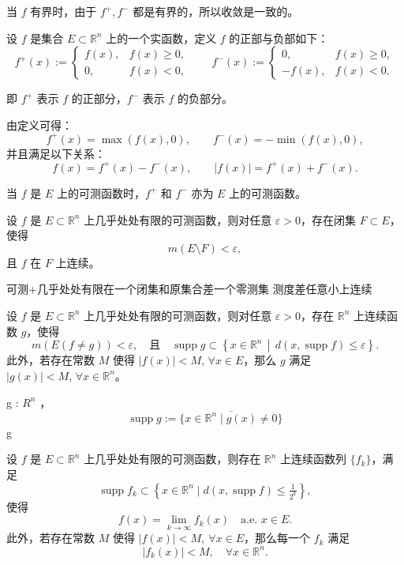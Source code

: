 \documentclass[lang=cn,10pt]{elegantbook}
\begin{document}
当 $f$ 有界时，由于 $f^+, f^-$ 都是有界的，所以收敛是一致的。
\begin{definition}
设 $f$ 是集合 $E \subset \mathbb{R}^n$ 上的一个实函数，定义 $f$ 的正部与负部如下：
\[
f^+(x) := 
\begin{cases}
f(x), & f(x) \geq 0, \\
0,    & f(x) < 0,
\end{cases}
\qquad
f^-(x) := 
\begin{cases}
0,    & f(x) \geq 0, \\
-f(x), & f(x) < 0.
\end{cases}
\]

即 $f^+$ 表示 $f$ 的正部分，$f^-$ 表示 $f$ 的负部分。

由定义可得：
\[
f^+(x) = \max(f(x), 0), \qquad f^-(x) = -\min(f(x), 0),
\]
并且满足以下关系：
\[
f(x) = f^+(x) - f^-(x), \qquad |f(x)| = f^+(x) + f^-(x).
\]

当 $f$ 是 $E$ 上的可测函数时，$f^+$ 和 $f^-$ 亦为 $E$ 上的可测函数。
\end{definition}
\begin{theorem}[Lusin]
设 $f$ 是 $E \subset \mathbb{R}^n$ 上几乎处处有限的可测函数，则对任意 $\varepsilon > 0$，存在闭集 $F \subset E$，使得
\[
m(E \setminus F) < \varepsilon,
\]
且 $f$ 在 $F$ 上连续。
\end{theorem}

可测+几乎处处有限在一个闭集和原集合差一个零测集 测度差任意小上连续
\begin{theorem}
设 $f$ 是 $E \subset \mathbb{R}^n$ 上几乎处处有限的可测函数，则对任意 $\varepsilon > 0$，存在 $\mathbb{R}^n$ 上连续函数 $g$，使得
\[
m(E(f \neq g)) < \varepsilon, \quad \text{且} \quad \operatorname{supp} g \subset \left\{ x \in \mathbb{R}^n \,\middle|\, d(x, \operatorname{supp} f) \leq \varepsilon \right\}.
\]
此外，若存在常数 $M$ 使得 $|f(x)| < M, \, \forall x \in E$，那么 $g$ 满足 $|g(x)| < M, \, \forall x \in \mathbb{R}^n$。
\end{theorem}
 g : \mathbb${R}^n$ \to {}，
\[
\operatorname{supp} g := \overline{\{ x \in \mathbb{R}^n \mid g(x) \neq 0 \}}
\]
 g 
\begin{theorem}[3.2.4 可测函数是连续函数的极限]
设 $f$ 是 $E \subset \mathbb{R}^n$ 上几乎处处有限的可测函数，则存在 $\mathbb{R}^n$ 上连续函数列 $\{f_k\}$，满足
\[
\operatorname{supp} f_k \subset \left\{ x \in \mathbb{R}^n \mid d(x, \operatorname{supp} f) \leq \tfrac{1}{2^k} \right\},
\]
使得
\[
f(x) = \lim_{k \to \infty} f_k(x) \quad \text{a.e. } x \in E.
\]
此外，若存在常数 $M$ 使得 $|f(x)| < M,\ \forall x \in E$，那么每一个 $f_k$ 满足
\[
|f_k(x)| < M,\quad \forall x \in \mathbb{R}^n.
\]
\end{theorem}
\end{document}
